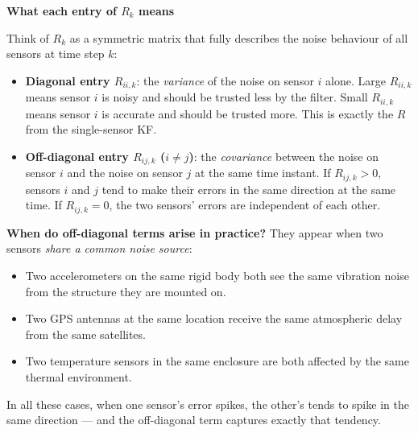 \documentclass[12pt, a4paper]{article}
\begin{document}
\begin{notebox}
  \textbf{What each entry of $R_k$ means}

  Think of $R_k$ as a symmetric matrix that fully describes the noise
  behaviour of all sensors at time step $k$:

  \begin{itemize}[leftmargin=1.2em, itemsep=3pt]
    \item \textbf{Diagonal entry $R_{ii,k}$}: the \emph{variance} of the
      noise on sensor $i$ alone.
      Large $R_{ii,k}$ means sensor $i$ is noisy and should be trusted
      less by the filter.
      Small $R_{ii,k}$ means sensor $i$ is accurate and should be trusted
      more.
      This is exactly the $R$ from the single-sensor KF.

    \item \textbf{Off-diagonal entry $R_{ij,k}$ ($i \neq j$)}: the
      \emph{covariance} between the noise on sensor $i$ and the noise on
      sensor $j$ at the same time instant.
      If $R_{ij,k} > 0$, sensors $i$ and $j$ tend to make their errors in
      the same direction at the same time.
      If $R_{ij,k} = 0$, the two sensors' errors are independent of each
      other.
  \end{itemize}

  \textbf{When do off-diagonal terms arise in practice?}
  They appear when two sensors \emph{share a common noise source}:

  \begin{itemize}[leftmargin=1.2em, itemsep=2pt]
    \item Two accelerometers on the same rigid body both see the same
      vibration noise from the structure they are mounted on.
    \item Two GPS antennas at the same location receive the same
      atmospheric delay from the same satellites.
    \item Two temperature sensors in the same enclosure are both affected
      by the same thermal environment.
  \end{itemize}

  In all these cases, when one sensor's error spikes, the other's tends
  to spike in the same direction --- and the off-diagonal term captures
  exactly that tendency.
\end{notebox}
\end{document}
